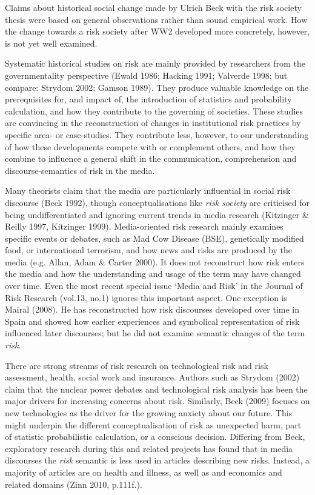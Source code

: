 Claims about historical social change made by Ulrich Beck with the risk society thesis were based on general observations rather than sound empirical work. How the change towards a risk society after WW2 developed more concretely, however, is not yet well examined.

Systematic historical studies on risk are mainly provided by researchers from the governmentality perspective (Ewald 1986; Hacking 1991; Valverde 1998; but compare: Strydom 2002; Gamson 1989). They produce valuable knowledge on the prerequisites for, and impact of, the introduction of statistics and probability calculation, and how they contribute to the governing of societies. These studies are convincing in the reconstruction of changes in institutional risk practices by specific area- or case-studies. They contribute less, however, to our understanding of how these developments compete with or complement others, and how they combine to influence a general shift in the communication, comprehension and discourse-semantics of risk in the media. 

Many theorists claim that the media are particularly influential in social risk discourse (Beck 1992), though conceptualisations like \emph{risk society} are criticised for being undifferentiated and ignoring current trends in media research (Kitzinger \& Reilly 1997, Kitzinger 1999). Media-oriented risk research mainly examines specific events or debates, such as Mad Cow Disease (BSE), genetically modified food, or international terrorism, and how news and risks are produced by the media (e.g. Allan, Adam \& Carter 2000). It does not reconstruct how risk enters the media and how the understanding and usage of the term may have changed over time. Even the most recent special issue `Media and Risk' in the Journal of Risk Research (vol.13, no.1) ignores this important aspect. One exception is Mairal (2008). He has reconstructed how risk discourses developed over time in Spain and showed how earlier experiences and symbolical representation of risk influenced later discourses; but he did not examine semantic changes of the term \emph{risk}. 

There are strong streams of risk research on technological risk and risk assessment, health, social work and insurance. Authors such as Strydom (2002) claim that the nuclear power debates and technological risk analysis has been the major drivers for increasing concerns about risk. Similarly, Beck (2009) focuses on new technologies as the driver for the growing anxiety about our future. This might underpin the different conceptualisation of risk as unexpected harm, part of statistic probabilistic calculation, or a conscious decision. Differing from Beck, exploratory research during this and related projects has found that in media discourses the \emph{risk} semantic is less used in articles describing new risks. Instead, a majority of articles are on health and illness, as well as and economics and related domains (Zinn 2010, p.111f.).

